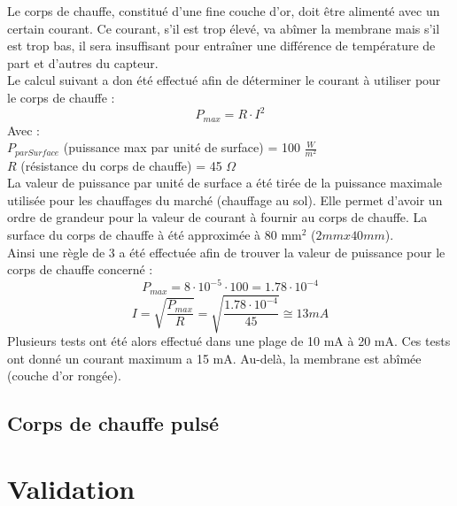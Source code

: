 Le corps de chauffe, constitué d'une fine couche d'or, doit être alimenté avec un certain courant. Ce courant, s'il est trop élevé, va abîmer la
membrane mais s'il est trop bas, il sera insuffisant pour entraîner une différence de température de part et d'autres du capteur. \\

Le calcul suivant a don été effectué afin de déterminer le courant à utiliser pour le corps de chauffe :
\[P_{max} = R\cdot I^2\]
Avec :\\
$P_{parSurface}$ (puissance max par unité de surface) = 100 $\frac{W}{m^2}$\\
$R$ (résistance du corps de chauffe) = 45 $\Omega$\\

La valeur de puissance par unité de surface a été tirée de la puissance maximale utilisée pour les chauffages du marché (chauffage au sol).
Elle permet d'avoir un ordre de grandeur pour la valeur de courant à fournir au corps de chauffe.
La surface du corps de chauffe à été approximée à 80 mm$^2$ ($2mm x 40mm$).\\
Ainsi une règle de 3 a été effectuée afin de trouver la valeur de puissance pour le corps de chauffe concerné :
\[P_{max} = 8\cdot 10^{-5}\cdot 100 = 1.78\cdot 10^{-4}\]
\[I = \sqrt{\frac{P_{max}}{R}} = \sqrt{\frac{1.78\cdot 10^{-4}}{45}} \cong 13 mA\]
Plusieurs tests ont été alors effectué dans une plage de 10 mA à 20 mA. Ces tests ont donné un courant maximum a 15 mA. Au-delà, la membrane
est abîmée (couche d'or rongée).

\subsection{Corps de chauffe pulsé}

\section{Validation}
